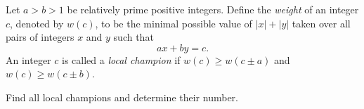 Let $a > b > 1$ be relatively prime positive integers. Define the \emph{weight} of an integer $c$, denoted by $w(c)$, to be the minimal possible value of $|x| + |y|$ taken over all pairs of integers $x$ and $y$ such that
\[
ax + by = c.
\]
An integer $c$ is called a \emph{local champion} if $w(c) \geq w(c \pm a)$ and $w(c) \geq w(c \pm b)$.

Find all local champions and determine their number.
